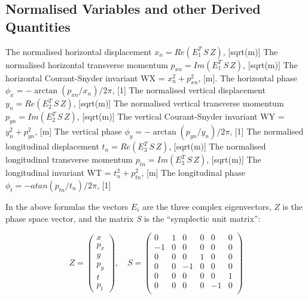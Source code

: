 \subsection{Normalised Variables and other Derived Quantities}
\label{subsec:tables_normal}
\begin{madlist}
   The normalised horizontal displacement \quad
  $x_n = Re ( E_1^T \, S\, Z )$, [sqrt(m)]
   The normalised horizontal transverse momentum \quad
  $p_{xn} = Im ( E_1^T\, S\, Z )$, [sqrt(m)]
   The horizontal Courant-Snyder invariant \quad
  WX = $x_n^2 + p_{xn}^2$, [m].    
   The horizontal phase \quad
  $\phi_x = -\arctan ( p_{xn} / x_n ) / 2 \pi$, [1]
   The normalised vertical displacement \quad 
  $y_n = Re ( E_2^T \,S\, Z )$, [sqrt(m)]
   The normalised vertical transverse momentum \quad
  $p_{yn} = Im ( E_2^T\, S\, Z )$, [sqrt(m)]
   The vertical Courant-Snyder invariant \quad
  WY = $y_n^2 + p_{yn}^2$, [m]
   The vertical phase \quad
  $\phi_y = -\arctan ( p_{yn} / y_n ) / 2 \pi$, [1]
   The normalised longitudinal displacement \quad
  $t_n = Re ( E_3^T \,S\, Z )$, [sqrt(m)]
   The normalised longitudinal transverse momentum \quad
  $p_{tn} = Im ( E_3^T\, S\, Z )$, [sqrt(m)]
   The longitudinal invariant \quad
  WT = $t_n^2 + p_{tn}^2$, [m]
   The longitudinal phase \quad
  $\phi_t = - atan ( p_{tn} / t_n ) / 2 \pi$, [1]
\end{madlist} 

In the above formulas the vectors \(E_i\) are the three complex
eigenvectors, \(Z\) is the phase space vector, and the matrix {\it S}
is the ``symplectic unit matrix'':   

\begin{equation}
Z = \left(
\begin{array}{l} x \\ p_x \\ y \\ p_y \\ t \\ p_t
\end{array} \right), \quad
S =
 \begin{pmatrix}
  0 & 1 & 0 & 0 & 0 & 0 \\
  -1 & 0 & 0 & 0 & 0 & 0 \\
  0 & 0 & 0 & 1 & 0 & 0 \\
  0 & 0 & -1 & 0 & 0 & 0 \\
  0 & 0 & 0 & 0 & 0 & 1 \\
  0 & 0 & 0 & 0 & -1 & 0 \\
 \end{pmatrix}
\end{equation}


